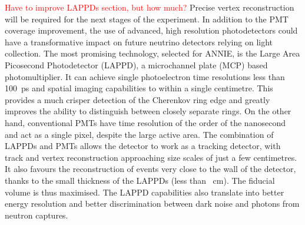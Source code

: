  \textcolor{red}{Have to improve LAPPDs section, but how much?}
 Precise vertex reconstruction will be required for the next stages of the experiment.
 In addition to the PMT coverage improvement, the use of advanced, high resolution photodetectors %
 could have a transformative impact on future neutrino detectors relying on light collection.
 The most promising technology, selected for ANNIE, is the Large Area Picosecond Photodetector %
 (LAPPD), a microchannel plate (MCP) based photomultiplier.
 It can achieve single photoelectron time resolutions less than 100~ps and spatial imaging %
 capabilities to within a single centimetre.
 This provides a much crisper detection of the Cherenkov ring edge and greatly improves the %
 ability to distinguish between closely separate rings.
 On the other hand, conventional PMTs have time resolution of the order of the nanosecond and act %
 as a single pixel, despite the large active area.
 The combination of LAPPDs and PMTs allows the detector to work as a tracking detector, %
 with track and vertex reconstruction approaching size scales of just a few centimetres.
 It also favours the reconstruction of events very close to the wall of the detector, %
 thanks to the small thickness of the LAPPDs (less than ~cm).
 The fiducial volume is thus maximised.
 The LAPPD capabilities also translate into better energy resolution and better discrimination %
 between dark noise and photons from neutron captures.

